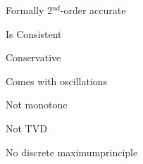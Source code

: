 \begin{sectionbox}
    \begin{proslist}
        \item Formally 2$^{nd}$-order accurate
        \item Is Consistent
        \item Conservative
    \end{proslist}
    \begin{conslist}
        \item Comes with oscillations
        \item Not monotone
        \item Not TVD
        \item No discrete maximumprinciple
    \end{conslist}
\end{sectionbox}
